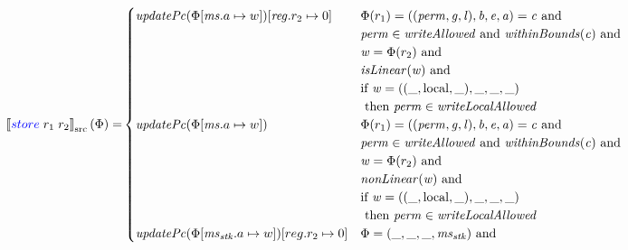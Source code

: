 \documentclass[a4paper]{article}
\newcommand{\sem}[1]{\left\llbracket #1 \right\rrbracket}
\newcommand{\ssem}[2][\Phi]{\sem{#2}_{\mathrm{src}}(#1)}
\newcommand{\tand}{\text{ and }}
\newcommand{\sourcecolor}[1]{\color{blue}}
\newcommand{\src}[1]{{\sourcecolor{} #1}}
\newcommand{\zinstr}[1]{#1}
\newcommand{\twoinstr}[3]{
  \ifthenelse{\equal{#2#3}{}}
  {\zinstr{#1}}
  {\zinstr{#1} \; #2 \; #3}
}
\newcommand{\sstore}[2]{\twoinstr{\src{store}}{#1}{#2}}
\newcommand{\update}[2]{[#1 \mapsto #2]}
\newcommand{\perm}{\var{perm}}
\newcommand{\gl}{\var{g}}
\newcommand{\lin}{\var{l}}
\newcommand{\var}[1]{\mathit{#1}}
\newcommand{\reg}{\var{reg}}
\newcommand{\ms}{\var{ms}}
\newcommand{\stk}{\var{stk}}
\newcommand{\baddr}{\var{b}}
\newcommand{\eaddr}{\var{e}}
\newcommand{\aaddr}{\var{a}}
\newcommand{\plainlocality}[1]{\mathrm{#1}}
\newcommand{\local}{\plainlocality{local}}
\newcommand{\plainfun}[2]{
  \ifthenelse{\equal{#2}{}}
  {\mathit{#1}}
  {\mathit{#1}(#2)}
}
\newcommand{\updPcAddr}[1]{\plainfun{updatePc}{#1}}
\newcommand{\writeAllowed}[1]{\plainfun{writeAllowed}{#1}}
\newcommand{\writeLocalAllowed}[1]{\plainfun{writeLocalAllowed}{#1}}
\newcommand{\nonLinear}[1]{\plainfun{nonLinear}{#1}}
\newcommand{\isLinear}[1]{\plainfun{isLinear}{#1}}
\newcommand{\withinBounds}[1]{\plainfun{withinBounds}{#1}}
\begin{document}
\begin{align*}
  \ssem{\sstore{r_1}{r_2}} = & 
                               \begin{cases}
                                 \updPcAddr{\Phi\update{\ms.a}{w}}\update{\reg.r_2}{0} &
                                 \arraycolsep=0pt
                                 \begin{array}[t]{l}
                                   \Phi(r_1) = ((\perm,\gl,\lin),\baddr,\eaddr,\aaddr) = \var{c} \tand\\
                                   \perm \in \writeAllowed{} \tand \withinBounds{\var{c}} \tand \\
                                   \var{w} = \Phi(r_2) \tand \\
                                   \isLinear{\var{w}} \tand \\
                                   \text{if } \var{w} = ((\_,\local,\_),\_,\_,\_) \\
                                   \text{ then } \perm \in \writeLocalAllowed{}
                                 \end{array} \\
                                 \updPcAddr{\Phi\update{\ms.a}{w}} &
                                 \arraycolsep=0pt
                                 \begin{array}[t]{l}
                                   \Phi(r_1) = ((\perm,\gl,\lin),\baddr,\eaddr,\aaddr) = \var{c} \tand\\
                                   \perm \in \writeAllowed{} \tand \withinBounds{\var{c}} \tand \\
                                   \var{w} = \Phi(r_2) \tand \\
                                   \nonLinear{\var{w}} \tand \\
                                   \text{if } \var{w} = ((\_,\local,\_),\_,\_,\_) \\
                                   \text{ then } \perm \in \writeLocalAllowed{}
                                 \end{array} \\
%
                                 \updPcAddr{\Phi\update{\ms_\stk.a}{w}}\update{reg.r_2}{0} & 
                                 \arraycolsep=0pt
                                 \begin{array}[t]{l}
                                   \Phi = (\_, \_, \_, \ms_\stk) \tand \\

\end{array}
\end{cases}
\end{align*}
\end{document}
